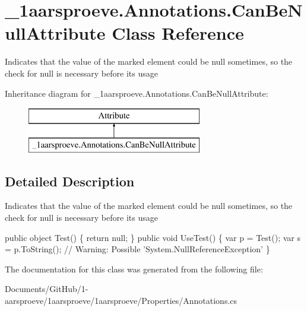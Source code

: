 \hypertarget{class__1aarsproeve_1_1_annotations_1_1_can_be_null_attribute}{}\section{\+\_\+1aarsproeve.\+Annotations.\+Can\+Be\+Null\+Attribute Class Reference}
\label{class__1aarsproeve_1_1_annotations_1_1_can_be_null_attribute}


Indicates that the value of the marked element could be {\ttfamily null} sometimes, so the check for {\ttfamily null} is necessary before its usage  


Inheritance diagram for \+\_\+1aarsproeve.\+Annotations.\+Can\+Be\+Null\+Attribute\+:\begin{figure}[H]
\begin{center}
\leavevmode
\includegraphics[height=2.000000cm]{class__1aarsproeve_1_1_annotations_1_1_can_be_null_attribute}
\end{center}
\end{figure}


\subsection{Detailed Description}
Indicates that the value of the marked element could be {\ttfamily null} sometimes, so the check for {\ttfamily null} is necessary before its usage 


\begin{DoxyCode}
[CanBeNull] \textcolor{keyword}{public} \textcolor{keywordtype}{object} Test() \{ \textcolor{keywordflow}{return} null; \}
\textcolor{keyword}{public} \textcolor{keywordtype}{void} UseTest() \{
  var p = Test();
  var s = p.ToString(); \textcolor{comment}{// Warning: Possible 'System.NullReferenceException'}
\}
\end{DoxyCode}


The documentation for this class was generated from the following file\+:\begin{DoxyCompactItemize}
\item 
Documents/\+Git\+Hub/1-\/aarsproeve/1aarsproeve/1aarsproeve/\+Properties/Annotations.\+cs\end{DoxyCompactItemize}
